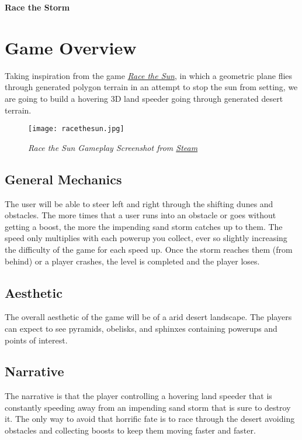 \documentclass[11pt]{article}
\begin{document}
\begin{center}
	\LARGE \textbf{Race the Storm}
\end{center}

\section*{Game Overview}
Taking inspiration from the game \href{https://store.steampowered.com/app/253030/Race_The_Sun/}{\textit{Race the Sun}},
in which a geometric plane flies through generated polygon terrain in an attempt to stop the sun from setting, we are going to build a hovering 3D land speeder going through generated desert terrain.

\begin{figure}[h]
	\begin{center}
		\texttt{[image: racethesun.jpg]}
	\end{center}
	\caption{\textit{Race the Sun Gameplay Screenshot from \href{https://store.steampowered.com/app/253030/Race_The_Sun/}{Steam}}}
	\label{fig:racethesun}
\end{figure}

\subsection*{General Mechanics}
The user will be able to steer left and right through the shifting dunes and obstacles.
The more times that a user runs into an obstacle or goes without getting a boost, the more the impending sand storm catches up to them.
The speed only multiplies with each powerup you collect, ever so slightly increasing the difficulty of the game for each speed up.
Once the storm reaches them (from behind) or a player crashes, the level is completed and the player loses.

\subsection*{Aesthetic}
The overall aesthetic of the game will be of a arid desert landscape.
The players can expect to see pyramids, obelisks, and sphinxes containing powerups and points of interest.

\subsection*{Narrative}
The narrative is that the player controlling a hovering land speeder that is constantly speeding away from an impending sand storm that is sure to destroy it.
The only way to avoid that horrific fate is to race through the desert avoiding obstacles and collecting boosts to keep them moving faster and faster.
\end{document}
